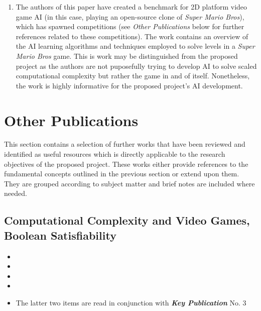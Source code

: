 \documentclass[a4paper]{article}
\begin{document}
\begin{enumerate}
  \item {}
  \par \noindent The authors of this paper have created a benchmark for 2D platform video game AI (in this case, playing an open-source clone of \textit{Super Mario Bros}), which has spawned competitions (see \textit{Other Publications} below for further references related to these competitions). The work contains an overview of the AI learning algorithms and techniques employed to solve levels in a \textit{Super Mario Bros} game. This is work may be distinguished from the proposed project as the authors are not puposefully trying to develop AI to solve scaled computational complexity but rather the game in and of itself. Nonetheless, the work is highly informative for the proposed project's AI development.

\end{enumerate}
\vspace{-5mm}
\section{Other Publications}
\vspace{-5mm}
\par \noindent This section contains a selection of further works that have been reviewed and identified as useful resources which is directly applicable to the research objectives of the proposed project. These works either provide references to the fundamental concepts outlined in the previous section or extend upon them. They are grouped according to subject matter and brief notes are included where needed.

\subsection{Computational Complexity and Video Games, Boolean Satisfiability}
\begin{itemize}
  \item {} \vspace{-2.5mm}
  \item {} \vspace{-2.5mm}
  \item {} \vspace{-2.5mm}
  \item {} \vspace{-2.5mm}
  \item {}
  \par \noindent The latter two items are read in conjunction with \textbf{\textit{Key Publication}} No. 3
\end{itemize}
\end{document}
